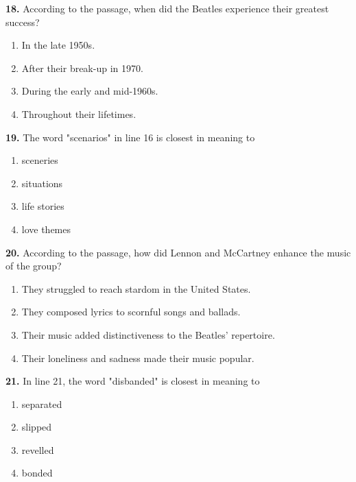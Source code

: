 \documentclass[12pt]{article}
\begin{document}
\par
\vspace{0.25\baselineskip}
\noindent\textbf{18.} According to the passage, when did the Beatles experience their greatest success?
\begin{enumerate}[label=(\Alph*),leftmargin=*,itemsep=0.2em]
\item In the late 1950s.
\item After their break-up in 1970.
\item During the early and mid-1960s.
\item Throughout their lifetimes.
\end{enumerate}
\par
\vspace{0.25\baselineskip}
\noindent\textbf{19.} The word "scenarios" in line 16 is closest in meaning to
\begin{enumerate}[label=(\Alph*),leftmargin=*,itemsep=0.2em]
\item sceneries
\item situations
\item life stories
\item love themes
\end{enumerate}
\par
\vspace{0.25\baselineskip}
\noindent\textbf{20.} According to the passage, how did Lennon and McCartney enhance the music of the group?
\begin{enumerate}[label=(\Alph*),leftmargin=*,itemsep=0.2em]
\item They struggled to reach stardom in the United States.
\item They composed lyrics to scornful songs and ballads.
\item Their music added distinctiveness to the Beatles' repertoire.
\item Their loneliness and sadness made their music popular.
\end{enumerate}
\par
\vspace{0.25\baselineskip}
\noindent\textbf{21.} In line 21, the word "disbanded" is closest in meaning to
\begin{enumerate}[label=(\Alph*),leftmargin=*,itemsep=0.2em]
\item separated
\item slipped
\item revelled
\item bonded
\end{enumerate}
\par
\vspace{0.25\baselineskip}
\end{document}
